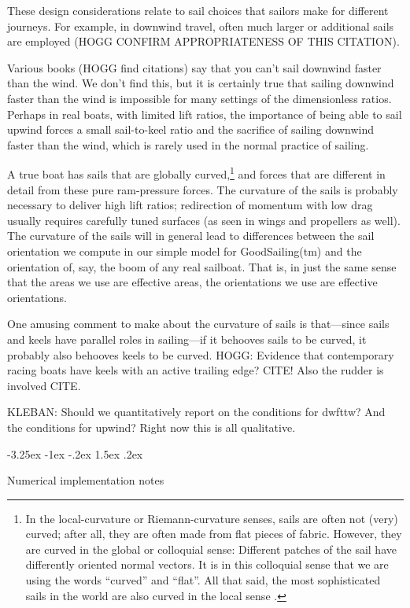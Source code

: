 \documentclass[letterpaper]{article}
\makeatletter
\renewcommand\section{\@startsection {section}{1}{\z@}%
  {-3.25ex \@plus -1ex \@minus -.2ex}%
  {1.5ex \@plus .2ex}%
  {\raggedright\normalfont\large\bfseries}}
\makeatother
\begin{document}
These design considerations relate to sail choices that sailors make for different journeys.
For example, in downwind travel, often much larger or additional sails are employed \cite{sails} (HOGG CONFIRM APPROPRIATENESS OF THIS CITATION).

Various books (HOGG find citations) say that you can't sail downwind faster than the wind.
We don't find this, but it is certainly true that sailing downwind faster than the wind is impossible for many settings of the dimensionless ratios.
Perhaps in real boats, with limited lift ratios, the importance of being able to sail upwind forces a small sail-to-keel ratio and the sacrifice of sailing downwind faster than the wind, which is rarely used in the normal practice of sailing.

A true boat has sails that are globally curved,\footnote{%
In the local-curvature or Riemann-curvature senses, sails are often not (very) curved; after all, they are often made from flat pieces of fabric.
However, they are curved in the global or colloquial sense: Different patches of the sail have differently oriented normal vectors.
It is in this colloquial sense that we are using the words ``curved'' and ``flat''.
All that said, the most sophisticated sails in the world are also curved in the local sense \cite{sails}.}
and forces that are different in detail from these pure ram-pressure forces.
The curvature of the sails is probably necessary to deliver high lift ratios; redirection of momentum with low drag usually requires carefully tuned surfaces (as seen in wings and propellers as well).
The curvature of the sails will in general lead to differences between the sail orientation we compute in our simple model for GoodSailing(tm) and the orientation of, say, the boom of any real sailboat.
That is, in just the same sense that the areas we use are effective areas, the orientations we use are effective orientations.

One amusing comment to make about the curvature of sails is that---since sails and keels have parallel roles in sailing---if it behooves sails to be curved, it probably also behooves keels to be curved.
HOGG: Evidence that contemporary racing boats have keels with an active trailing edge? CITE! Also the rudder is involved CITE.

KLEBAN: Should we quantitatively report on the conditions for dwfttw? And the conditions for upwind? Right now this is all qualitative.

\section{Numerical implementation notes}\label{sec:implementation}
\end{document}
